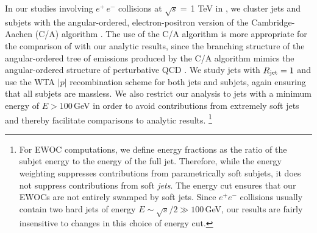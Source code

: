 \begin{subappendices}
In our studies involving \(e^+\,e^-\) collisions at \(\sqrt{s}=\,\)1 TeV in , we cluster jets and subjets with the angular-ordered, electron-positron version of the Cambridge-Aachen (C/A) algorithm
\cite{Dokshitzer:1997in,Wobisch:1998wt}.
%
The use of the C/A algorithm is more appropriate for the comparison of \pythia{} with our analytic results, since the branching structure of the angular-ordered tree of emissions produced by the C/A algorithm mimics the angular-ordered structure of perturbative QCD \cite{Ellis:1996mzs}.
%
We study jets with \(R_\text{jet} = 1\) and use the WTA \(|p|\) recombination scheme \cite{Larkoski:2014uqa} for both jets and subjets, again ensuring that all subjets are massless.
%
We also restrict our analysis to jets with a minimum energy of \(E > 100\,\)GeV in order to avoid contributions from extremely soft jets and thereby facilitate comparisons to analytic results.%
\footnote{
    For EWOC computations, we define energy fractions as the ratio of the subjet energy to the energy of the full jet.
    Therefore, while the energy weighting suppresses contributions from parametrically soft subjets, it does not suppress contributions from soft \textit{jets}.
    The energy cut ensures that our EWOCs are not entirely swamped by soft jets.
    Since \(e^+ e^-\) collisions usually contain two hard jets of energy \(E \sim \sqrt{s}/2 \gg 100\,\)GeV, our results are fairly insensitive to changes in this choice of energy cut.
}
\end{subappendices}


